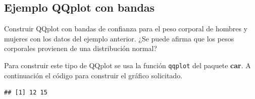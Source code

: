 \documentclass[
]{book}
\makeatletter
\newenvironment{Shaded}{\begin{snugshade}}{\end{snugshade}}
\newcommand{\AttributeTok}[1]{\textcolor[rgb]{0.77,0.63,0.00}{#1}}
\newcommand{\DecValTok}[1]{\textcolor[rgb]{0.00,0.00,0.81}{#1}}
\newcommand{\FunctionTok}[1]{\textcolor[rgb]{0.00,0.00,0.00}{#1}}
\newcommand{\NormalTok}[1]{#1}
\newcommand{\SpecialCharTok}[1]{\textcolor[rgb]{0.00,0.00,0.00}{#1}}
\newcommand{\StringTok}[1]{\textcolor[rgb]{0.31,0.60,0.02}{#1}}
\newenvironment{kframe}{%
\medskip{}
\setlength{\fboxsep}{.8em}
 \def\at@end@of@kframe{}%
 \ifinner\ifhmode%
  \def\at@end@of@kframe{\end{minipage}}%
  \begin{minipage}{\columnwidth}%
 \fi\fi%
 \def\FrameCommand##1{\hskip\@totalleftmargin \hskip-\fboxsep
 \colorbox{shadecolor}{##1}\hskip-\fboxsep
     \hskip-\linewidth \hskip-\@totalleftmargin \hskip\columnwidth}%
 \MakeFramed {\advance\hsize-\width
   \@totalleftmargin\z@ \linewidth\hsize
   \@setminipage}}%
 {\par\unskip\endMakeFramed%
 \at@end@of@kframe}
\renewenvironment{Shaded}{\begin{kframe}}{\end{kframe}}
\makeatother
\begin{document}
\hypertarget{ejemplo-qqplot-con-bandas}{%
\subsection*{Ejemplo QQplot con bandas}\label{ejemplo-qqplot-con-bandas}}

Construir QQplot con bandas de confianza para el peso corporal de hombres y mujeres con los datos del ejemplo anterior. ¿Se puede afirma que los pesos corporales provienen de una distribución normal?

Para construir este tipo de QQplot se usa la función \texttt{qqplot} del paquete \textbf{car}. A continuación el código para construir el gráfico solicitado.

\begin{Shaded}
\end{Shaded}

\begin{verbatim}
## [1] 12 15
\end{verbatim}

\begin{Shaded}
\end{Shaded}
\end{document}
